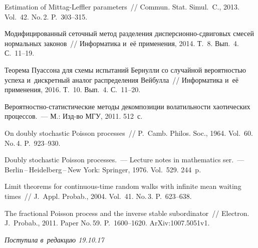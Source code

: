 \begin{multicols}{2}
{{\begin{thebibliography}{99}
 Estimation of Mittag-Leffler
parameters~// Commun. Stat. Simul.~C., 2013. Vol.~42. No.\,2. P.~303--315.

Модифицированный сеточный метод разделения дис\-пер\-си\-он\-но-сдви\-го\-вых
смесей нормальных законов~// Информатика и~её применения, 2014. Т.~8. Вып.~4. С.~11--19.

Теорема Пуассона для схемы испытаний Бернулли со
случайной вероятностью успеха и~дискретный аналог распределения
Вейбулла~// Информатика и~её применения, 2016. Т.~10. Вып.~4. С.~11--20.

 Ве\-ро\-ят\-ност\-но-ста\-ти\-сти\-че\-ские методы декомпозиции
волатильности хаотических процессов.~--- М.: Изд-во МГУ, 2011. 512~с.

 On doubly stochastic Poisson
processes~// P.~Camb. Philos. Soc., 1964. Vol.~60. No.\,4. P.~923--930.

 {Doubly stochastic Poisson processes}.~--- 
Lecture notes in mathematics ser.~--- Berlin\,--\,Heidelberg\,--\,New York:
Springer, 1976. Vol.~529. 244~p.

Limit theorems for continuous-time random walks with infinite mean
waiting times~// J.~Appl. Probab., 2004. Vol.~41. No.\,3. P.~623--638.

The fractional Poisson process and the inverse stable
subordinator~// Electron. J.~Probab., 2011. Paper No.\,59. P.~1600--1620. 
{\sf ArXiv:1007.5051v1}.

 \end{thebibliography}

 }
 }

\end{multicols}

\vspace*{-6pt}

\hfill{\small\textit{Поступила в~редакцию 19.10.17}}

\vspace*{8pt}



